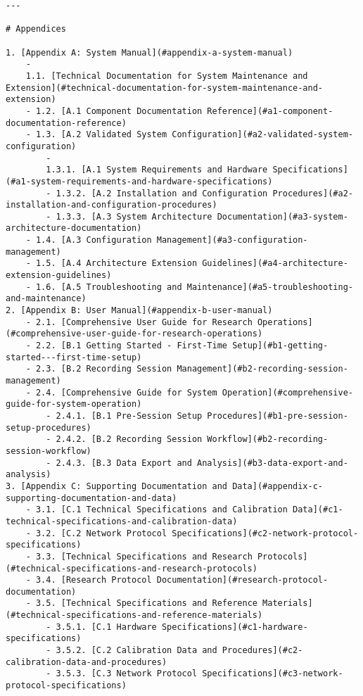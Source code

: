 \documentclass[11pt,a4paper]{report}
\begin{document}
\begin{verbatim}
---

# Appendices

1. [Appendix A: System Manual](#appendix-a-system-manual)
    -
    1.1. [Technical Documentation for System Maintenance and Extension](#technical-documentation-for-system-maintenance-and-extension)
    - 1.2. [A.1 Component Documentation Reference](#a1-component-documentation-reference)
    - 1.3. [A.2 Validated System Configuration](#a2-validated-system-configuration)
        -
        1.3.1. [A.1 System Requirements and Hardware Specifications](#a1-system-requirements-and-hardware-specifications)
        - 1.3.2. [A.2 Installation and Configuration Procedures](#a2-installation-and-configuration-procedures)
        - 1.3.3. [A.3 System Architecture Documentation](#a3-system-architecture-documentation)
    - 1.4. [A.3 Configuration Management](#a3-configuration-management)
    - 1.5. [A.4 Architecture Extension Guidelines](#a4-architecture-extension-guidelines)
    - 1.6. [A.5 Troubleshooting and Maintenance](#a5-troubleshooting-and-maintenance)
2. [Appendix B: User Manual](#appendix-b-user-manual)
    - 2.1. [Comprehensive User Guide for Research Operations](#comprehensive-user-guide-for-research-operations)
    - 2.2. [B.1 Getting Started - First-Time Setup](#b1-getting-started---first-time-setup)
    - 2.3. [B.2 Recording Session Management](#b2-recording-session-management)
    - 2.4. [Comprehensive Guide for System Operation](#comprehensive-guide-for-system-operation)
        - 2.4.1. [B.1 Pre-Session Setup Procedures](#b1-pre-session-setup-procedures)
        - 2.4.2. [B.2 Recording Session Workflow](#b2-recording-session-workflow)
        - 2.4.3. [B.3 Data Export and Analysis](#b3-data-export-and-analysis)
3. [Appendix C: Supporting Documentation and Data](#appendix-c-supporting-documentation-and-data)
    - 3.1. [C.1 Technical Specifications and Calibration Data](#c1-technical-specifications-and-calibration-data)
    - 3.2. [C.2 Network Protocol Specifications](#c2-network-protocol-specifications)
    - 3.3. [Technical Specifications and Research Protocols](#technical-specifications-and-research-protocols)
    - 3.4. [Research Protocol Documentation](#research-protocol-documentation)
    - 3.5. [Technical Specifications and Reference Materials](#technical-specifications-and-reference-materials)
        - 3.5.1. [C.1 Hardware Specifications](#c1-hardware-specifications)
        - 3.5.2. [C.2 Calibration Data and Procedures](#c2-calibration-data-and-procedures)
        - 3.5.3. [C.3 Network Protocol Specifications](#c3-network-protocol-specifications)

\end{verbatim}
\end{document}
